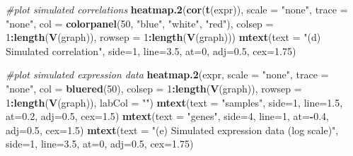 \documentclass[]{article}
\newenvironment{Shaded}{\begin{snugshade}}{\end{snugshade}}
\newcommand{\CommentTok}[1]{\textcolor[rgb]{0.56,0.35,0.01}{\textit{#1}}}
\newcommand{\DataTypeTok}[1]{\textcolor[rgb]{0.13,0.29,0.53}{#1}}
\newcommand{\DecValTok}[1]{\textcolor[rgb]{0.00,0.00,0.81}{#1}}
\newcommand{\FloatTok}[1]{\textcolor[rgb]{0.00,0.00,0.81}{#1}}
\newcommand{\KeywordTok}[1]{\textcolor[rgb]{0.13,0.29,0.53}{\textbf{#1}}}
\newcommand{\NormalTok}[1]{#1}
\newcommand{\OperatorTok}[1]{\textcolor[rgb]{0.81,0.36,0.00}{\textbf{#1}}}
\newcommand{\StringTok}[1]{\textcolor[rgb]{0.31,0.60,0.02}{#1}}
\begin{document}
\begin{Shaded}
\begin{Highlighting}[]
\CommentTok{#plot simulated correlations}
\KeywordTok{heatmap.2}\NormalTok{(}\KeywordTok{cor}\NormalTok{(}\KeywordTok{t}\NormalTok{(expr)), }\DataTypeTok{scale =} \StringTok{"none"}\NormalTok{, }\DataTypeTok{trace =} \StringTok{"none"}\NormalTok{, }\DataTypeTok{col =} \KeywordTok{colorpanel}\NormalTok{(}\DecValTok{50}\NormalTok{, }\StringTok{"blue"}\NormalTok{, }\StringTok{"white"}\NormalTok{, }\StringTok{"red"}\NormalTok{),}
\DataTypeTok{colsep =} \DecValTok{1}\OperatorTok{:}\KeywordTok{length}\NormalTok{(}\KeywordTok{V}\NormalTok{(graph)), }\DataTypeTok{rowsep =} \DecValTok{1}\OperatorTok{:}\KeywordTok{length}\NormalTok{(}\KeywordTok{V}\NormalTok{(graph)))}
\KeywordTok{mtext}\NormalTok{(}\DataTypeTok{text =} \StringTok{"(d) Simulated correlation"}\NormalTok{, }\DataTypeTok{side=}\DecValTok{1}\NormalTok{, }\DataTypeTok{line=}\FloatTok{3.5}\NormalTok{, }\DataTypeTok{at=}\DecValTok{0}\NormalTok{, }\DataTypeTok{adj=}\FloatTok{0.5}\NormalTok{, }\DataTypeTok{cex=}\FloatTok{1.75}\NormalTok{)}

\CommentTok{#plot simulated expression data}
\KeywordTok{heatmap.2}\NormalTok{(expr, }\DataTypeTok{scale =} \StringTok{"none"}\NormalTok{, }\DataTypeTok{trace =} \StringTok{"none"}\NormalTok{, }\DataTypeTok{col =} \KeywordTok{bluered}\NormalTok{(}\DecValTok{50}\NormalTok{),}
\DataTypeTok{colsep =} \DecValTok{1}\OperatorTok{:}\KeywordTok{length}\NormalTok{(}\KeywordTok{V}\NormalTok{(graph)), }\DataTypeTok{rowsep =} \DecValTok{1}\OperatorTok{:}\KeywordTok{length}\NormalTok{(}\KeywordTok{V}\NormalTok{(graph)), }\DataTypeTok{labCol =} \StringTok{""}\NormalTok{)}
\KeywordTok{mtext}\NormalTok{(}\DataTypeTok{text =} \StringTok{"samples"}\NormalTok{, }\DataTypeTok{side=}\DecValTok{1}\NormalTok{, }\DataTypeTok{line=}\FloatTok{1.5}\NormalTok{, }\DataTypeTok{at=}\FloatTok{0.2}\NormalTok{, }\DataTypeTok{adj=}\FloatTok{0.5}\NormalTok{, }\DataTypeTok{cex=}\FloatTok{1.5}\NormalTok{)}
\KeywordTok{mtext}\NormalTok{(}\DataTypeTok{text =} \StringTok{"genes"}\NormalTok{, }\DataTypeTok{side=}\DecValTok{4}\NormalTok{, }\DataTypeTok{line=}\DecValTok{1}\NormalTok{, }\DataTypeTok{at=}\OperatorTok{-}\FloatTok{0.4}\NormalTok{, }\DataTypeTok{adj=}\FloatTok{0.5}\NormalTok{, }\DataTypeTok{cex=}\FloatTok{1.5}\NormalTok{)}
\KeywordTok{mtext}\NormalTok{(}\DataTypeTok{text =} \StringTok{"(e) Simulated expression data (log scale)"}\NormalTok{, }\DataTypeTok{side=}\DecValTok{1}\NormalTok{, }\DataTypeTok{line=}\FloatTok{3.5}\NormalTok{, }\DataTypeTok{at=}\DecValTok{0}\NormalTok{, }\DataTypeTok{adj=}\FloatTok{0.5}\NormalTok{, }\DataTypeTok{cex=}\FloatTok{1.75}\NormalTok{)}
\end{Highlighting}
\end{Shaded}
\end{document}
